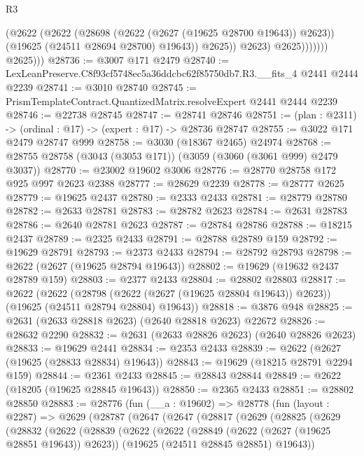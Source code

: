 \begin{lexlean}{R3}
\begin{coremodule}
                            (@2622
                              (@2622
                                (@28698 (@2622 (@2627 (@19625 @28700 @19643)) @2623))
                                (@19625 (@24511 @28694 @28700) @19643))
                              @2625))
                          @2623)
                        @2625)))))))
          @2625)))
@28736 := @3007 @171 @2479
@28740 := LexLeanPreserve.C8f93cf5748ec5a36ddcbc62f85750db7.R3.__fits_4 @2441 @2444 @2239
@28741 := @3010 @28740
@28745 := PrismTemplateContract.QuantizedMatrix.resolveExpert @2441 @2444 @2239
@28746 := @22738 @28745
@28747 := @28741 @28746
@28751 := (plan : @2311) -> (ordinal : @17) -> (expert : @17) -> @28736 @28747
@28755 := @3022 @171 @2479 @28747 @999
@28758 := @3030 (@18367 @2465) @24974
@28768 := @28755 @28758 (@3043 (@3053 @171)) (@3059 (@3060 (@3061 @999) @2479 @3037))
@28770 := @23002 @19602 @3006
@28776 := @28770 @28758 @172 @925 @997 @2623 @2388
@28777 := @28629 @2239
@28778 := @28777 @2625
@28779 := @19625 @2437
@28780 := @2333 @2433
@28781 := @28779 @28780
@28782 := @2633 @28781
@28783 := @28782 @2623
@28784 := @2631 @28783
@28786 := @2640 @28781 @2623
@28787 := @28784 @28786
@28788 := @18215 @2437
@28789 := @2325 @2433
@28791 := @28788 @28789 @159
@28792 := @19629 @28791
@28793 := @2373 @2433
@28794 := @28792 @28793
@28798 := @2622 (@2627 (@19625 @28794 @19643))
@28802 := @19629 (@19632 @2437 @28789 @159)
@28803 := @2377 @2433
@28804 := @28802 @28803
@28817 := @2622
    (@2622
      (@28798 (@2622 (@2627 (@19625 @28804 @19643)) @2623))
      (@19625 (@24511 @28794 @28804) @19643))
@28818 := @3876 @948
@28825 := @2631 (@2633 @28818 @2623) (@2640 @28818 @2623) @22672
@28826 := @28632 @2290
@28832 := @2631 (@2633 @28826 @2623) (@2640 @28826 @2623)
@28833 := @19629 @2441
@28834 := @2353 @2433
@28839 := @2622 (@2627 (@19625 (@28833 @28834) @19643))
@28843 := @19629 (@18215 @28791 @2294 @159)
@28844 := @2361 @2433
@28845 := @28843 @28844
@28849 := @2622 (@18205 (@19625 @28845 @19643))
@28850 := @2365 @2433
@28851 := @28802 @28850
@28883 := @28776
    (fun (__a : @19602) =>
    @28778
      (fun (layout : @2287) =>
      @2629
        (@28787
          (@2647
            (@2647
              (@28817
                (@2629
                  (@28825
                    (@2629
                      (@28832
                        (@2622
                          (@28839
                            (@2622
                              (@2622
                                (@28849 (@2622 (@2627 (@19625 @28851 @19643)) @2623))
                                (@19625 (@24511 @28845 @28851) @19643))

\end{coremodule}
\end{lexlean}
